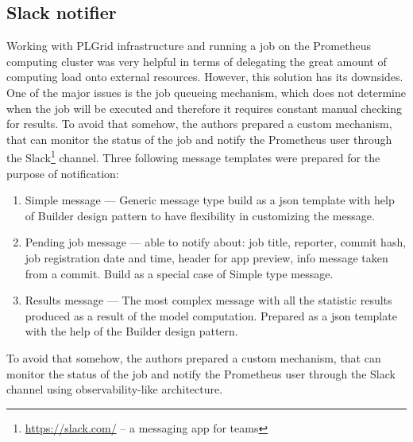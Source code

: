 \subsection{Slack notifier}\label{subsec:slack-notifier}
Working with PLGrid infrastructure and running a job on the Prometheus computing cluster was very helpful in terms of delegating the great amount of computing load onto external resources.
However, this solution has its downsides.
One of the major issues is the job queueing mechanism, which does not determine when the job will be executed and therefore it requires constant manual checking for results.
To avoid that somehow, the authors prepared a custom mechanism, that can monitor the status of the job and notify the Prometheus user through the Slack\footnote{\url{https://slack.com/} – a messaging app for teams} channel.
Three following message templates were prepared for the purpose of notification:
\begin{enumerate}
    \item Simple message --- Generic message type build as a \gls{json} template with help of Builder design pattern to have flexibility in customizing the message.
    \item Pending job message --- able to notify about: job title, reporter, commit hash, job registration date and time, header for app preview, info message taken from a commit.
    Build as a special case of Simple type message.
    \item Results message --- The most complex message with all the statistic results produced as a result of the model computation.
    Prepared as a \gls{json} template with the help of the Builder design pattern.
\end{enumerate}

To avoid that somehow, the authors prepared a custom mechanism, that can monitor the status of the job and notify the Prometheus user through the Slack channel using observability-like architecture.
